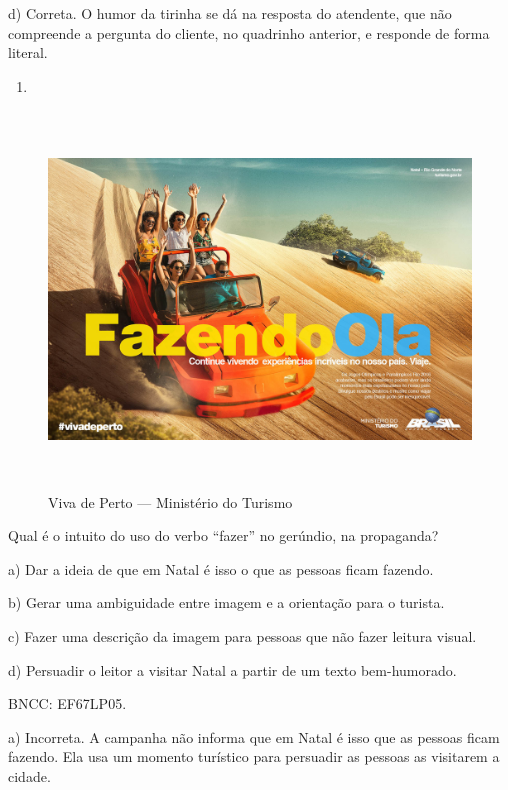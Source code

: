 d) Correta. O humor da tirinha se dá na resposta do atendente, que não
compreende a pergunta do cliente, no quadrinho anterior, e responde de
forma literal.

\begin{enumerate}
\def\labelenumi{\arabic{enumi}.}
\setcounter{enumi}{12}
\tightlist
\item
\end{enumerate}

\begin{figure}
\centering
\includegraphics[width=5.90556in,height=3.93403in]{./imgSAEB_6_POR/media/image43.jpeg}
\caption{Viva de Perto --- Ministério do Turismo}
\end{figure}


Qual é o intuito do uso do verbo ``fazer'' no gerúndio, na propaganda?

a) Dar a ideia de que em Natal é isso o que as pessoas ficam fazendo.

b) Gerar uma ambiguidade entre imagem e a orientação para o turista.

c) Fazer uma descrição da imagem para pessoas que não fazer leitura
visual.

d) Persuadir o leitor a visitar Natal a partir de um texto bem-humorado.

BNCC: EF67LP05.

a) Incorreta. A campanha não informa que em Natal é isso que as pessoas
ficam fazendo. Ela usa um momento turístico para persuadir as pessoas as
visitarem a cidade.

